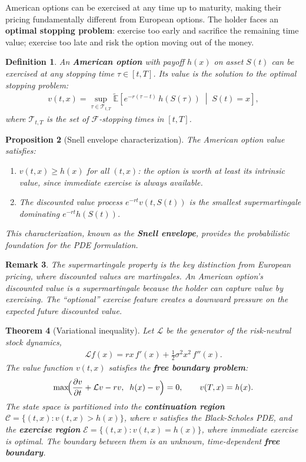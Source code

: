 \documentclass{report}
\theoremstyle{spacedplain}
\newtheorem{theorem}{Theorem}[section]
\newtheorem{proposition}[theorem]{Proposition}
\theoremstyle{spaceddefinition}
\newtheorem{definition}[theorem]{Definition}
\theoremstyle{spacedremark}
\newtheorem{remark}[theorem]{Remark}
\begin{document}
American options can be exercised at any time up to maturity, making their pricing fundamentally different from European options. The holder faces an \textbf{optimal stopping problem}: exercise too early and sacrifice the remaining time value; exercise too late and risk the option moving out of the money.

\begin{definition}
An \textbf{American option} with payoff $h(x)$ on asset $S(t)$ can be exercised at any stopping time $\tau \in [t,T]$. Its value is the solution to the optimal stopping problem:
\begin{align}
    v(t,x) = \sup_{\tau \in \mathcal{T}_{t,T}} \widetilde{\mathbb{E}}\!\left[e^{-r(\tau-t)}\,h(S(\tau))\;\middle|\;S(t) = x\right],
\end{align}
where $\mathcal{T}_{t,T}$ is the set of $\mathcal{F}$-stopping times in $[t,T]$.
\end{definition}

\begin{proposition}[Snell envelope characterization]
The American option value satisfies:
\begin{enumerate}
    \item $v(t,x) \geq h(x)$ for all $(t,x)$: the option is worth at least its intrinsic value, since immediate exercise is always available.
    \item The discounted value process $e^{-rt}v(t,S(t))$ is the smallest supermartingale dominating $e^{-rt}h(S(t))$.
\end{enumerate}
This characterization, known as the \textbf{Snell envelope}, provides the probabilistic foundation for the PDE formulation.
\end{proposition}

\begin{remark}
The supermartingale property is the key distinction from European pricing, where discounted values are martingales. An American option's discounted value is a supermartingale because the holder can capture value by exercising. The ``optional'' exercise feature creates a downward pressure on the expected future discounted value.
\end{remark}

\begin{theorem}[Variational inequality]
Let $\mathcal{L}$ be the generator of the risk-neutral stock dynamics,
\begin{align}
    \mathcal{L}f(x) = rx\,f'(x) + \frac{1}{2}\sigma^2 x^2\,f''(x).
\end{align}
The value function $v(t,x)$ satisfies the \textbf{free boundary problem}:
\begin{align}
    \max\!\Bigl(\frac{\partial v}{\partial t} + \mathcal{L}v - rv,\;\; h(x) - v\Bigr) = 0, \qquad v(T,x) = h(x).
\end{align}
The state space is partitioned into the \textbf{continuation region} $\mathcal{C} = \{(t,x) : v(t,x) > h(x)\}$, where $v$ satisfies the Black-Scholes PDE, and the \textbf{exercise region} $\mathcal{E} = \{(t,x) : v(t,x) = h(x)\}$, where immediate exercise is optimal. The boundary between them is an unknown, time-dependent \textbf{free boundary}.
\end{theorem}
\end{document}
